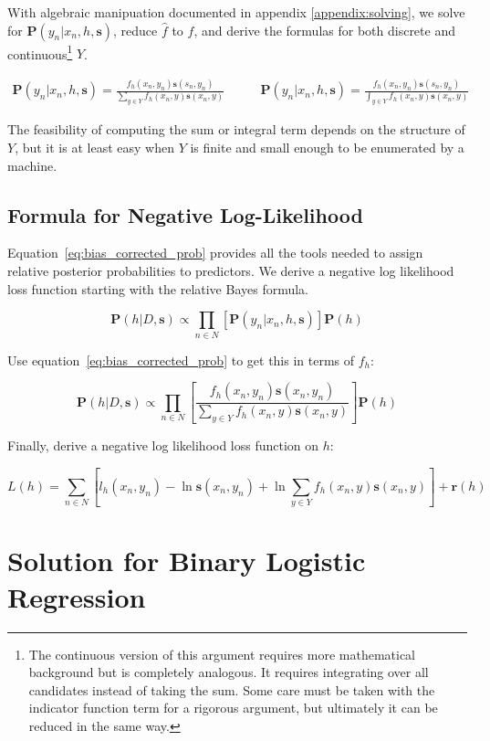 \documentclass[twoside]{article}
\begin{document}
With algebraic manipuation documented in appendix \ref{appendix:solving}, we solve for \(\mathbf{P}(y_n|x_n,h,\mathbf{s})\), reduce \(\hat{f}\) to \(f\), and derive the formulas for both discrete and continuous\footnote{The continuous version of this argument requires more mathematical background but is completely analogous. It requires integrating over all candidates instead of taking the sum. Some care must be taken with the indicator function term for a rigorous argument, but ultimately it can be reduced in the same way.} \(Y\).

\begin{align}
\label{eq:bias_corrected_prob}
\mathbf{P}(y_n|x_n,h,\mathbf{s})=\frac{f_h(x_n,y_n)\mathbf{s}(s_n,y_n)}{\sum_{y \in Y}f_h(x_n,y)\mathbf{s}(x_n,y)} &
\qquad\mathbf{P}(y_n|x_n,h,\mathbf{s})=\frac{f_h(x_n,y_n)\mathbf{s}(s_n,y_n)}{\int_{y \in Y}f_h(x_n,y)\mathbf{s}(x_n,y)}
\end{align}

The feasibility of computing the sum or integral term depends on the structure of \(Y\), but it is at least easy when \(Y\) is finite and small enough to be enumerated by a machine.

\subsection{Formula for Negative Log-Likelihood}

Equation~\eqref{eq:bias_corrected_prob} provides all the tools needed to assign relative posterior probabilities to predictors. We derive a negative log likelihood loss function starting with the relative Bayes formula.

\[\mathbf{P}(h|D,\mathbf{s})\propto\prod_{n \in N} \left[\mathbf{P}(y_n|x_n,h,\mathbf{s})\right]\mathbf{P}(h)\]

Use equation~\eqref{eq:bias_corrected_prob} to get this in terms of \(f_h\):

\[\mathbf{P}(h|D,\mathbf{s})\propto\prod_{n \in N} \left[\frac{f_h(x_n,y_n)\mathbf{s}(x_n,y_n)}{\sum_{y \in Y}f_h(x_n,y)\mathbf{s}(x_n,y)}\right]\mathbf{P}(h)\]

Finally, derive a negative log likelihood loss function on \(h\):

\[L(h)= \sum_{n \in N} \left[l_h(x_n,y_n)-\ln\mathbf{s}(x_n,y_n)+\ln\sum_{y \in Y}f_h(x_n,y)\mathbf{s}(x_n,y) \right] +\mathbf{r}(h)\]

\section{Solution for Binary Logistic Regression}
\label{section:logistic}
\end{document}
